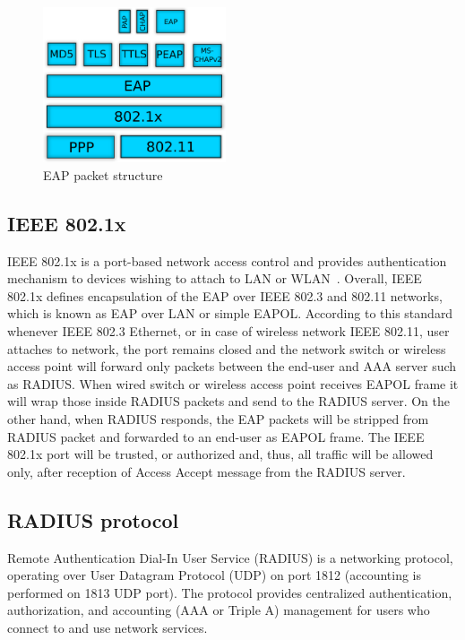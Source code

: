 \begin{figure}[!h]
	\includegraphics[width=0.48\textwidth]{graphics/EAP_packet_structure.png}
	\caption{EAP packet structure\protect\footnotemark}
	\label{fig:eap}
\end{figure}


\subsection{IEEE 802.1x}

IEEE 802.1x is a port-based network access control and provides authentication mechanism to devices wishing to attach to LAN or WLAN~\cite{}. Overall, IEEE 802.1x defines 
encapsulation of the EAP over IEEE 802.3 and 802.11 networks, which is known as EAP over LAN or simple EAPOL. According to this standard whenever IEEE 802.3 Ethernet, or in case of wireless network IEEE 802.11, user attaches to network, the port remains closed and the network switch or wireless access point will forward only packets between the end-user and AAA server such as RADIUS. When wired switch or wireless access point receives EAPOL frame it will wrap those inside RADIUS packets and send to the RADIUS server. On the other hand, when RADIUS responds, the EAP packets will be stripped from RADIUS packet and forwarded to an end-user as EAPOL frame. The IEEE 802.1x port will be trusted, or authorized and, thus, all traffic will be allowed only, after reception of Access Accept message from the RADIUS server.

\subsection{RADIUS protocol} 

Remote Authentication Dial-In User Service (RADIUS) is a networking protocol, 
operating over User Datagram Protocol (UDP) on port 1812 (accounting is 
performed on 1813 UDP port). The protocol provides centralized authentication, 
authorization, and accounting (AAA or Triple A) management for users who 
connect to and use network services.


